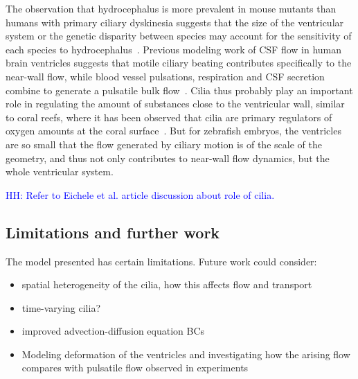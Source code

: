 \documentclass[fleqn]{wlscirep}
\newcommand{\lyng}[1]{\textcolor{blue}{#1}}
\begin{document}
The observation that hydrocephalus is more prevalent in mouse mutants than humans with primary ciliary dyskinesia suggests that the size of the ventricular system or the genetic disparity between species may account for the sensitivity of each species to hydrocephalus~\cite{Olstad2019CiliaryDevelopment}. Previous modeling work of CSF flow in human brain ventricles suggests that motile ciliary beating contributes specifically to the near-wall flow, while blood vessel pulsations, respiration and CSF secretion combine to generate a pulsatile bulk flow~\cite{Siyahhan2014FlowVentricles}. Cilia thus probably play an important role in regulating the amount of substances close to the ventricular wall, similar to coral reefs, where it has been observed that cilia are primary regulators of oxygen amounts at the coral surface~\cite{Pacherres2022CiliaryProduction}. But for zebrafish embryos, the ventricles are so small that the flow generated by ciliary motion is of the scale of the geometry, and thus not only contributes to near-wall flow dynamics, but the whole ventricular system.


\lyng{HH: Refer to Eichele et al. article discussion about role of cilia.}



\subsection*{Limitations and further work}
The model presented has certain limitations. Future work could consider:
\begin{itemize}
    \item spatial heterogeneity of the cilia, how this affects flow and transport
    \item time-varying cilia?
    \item improved advection-diffusion equation BCs
    \item Modeling deformation of the ventricles and investigating how the arising flow compares with pulsatile flow observed in experiments
\end{itemize}
\end{document}

